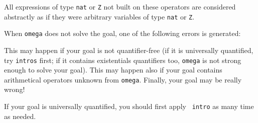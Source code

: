 All expressions of type \verb=nat= or \verb=Z= not built on these
operators are considered abstractly as if they
were arbitrary variables of type \verb=nat= or \verb=Z=.

\label{errors}

When {\tt omega} does not solve the goal, one of the following errors
is generated:

\begin{ErrMsgs}

\item {}

  This may happen if your goal is not quantifier-free (if it is
  universally quantified, try {\tt intros} first; if it contains
  existentials quantifiers too, {\tt omega} is not strong enough to solve your
  goal). This may happen also if your goal contains arithmetical
  operators unknown from {\tt omega}. Finally, your goal may be really
  wrong!

\item {}

  If your goal is universally quantified, you should first apply {\tt
    intro} as many time as needed.

\item {}

\item {}

\item {}

\item {}

\item {}

\item {}

\end{ErrMsgs}



